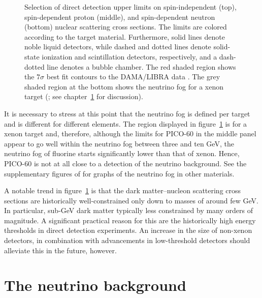 \begin{figure}
    \vspace*{-1.0pc}
    \caption{Selection of direct detection upper limits on spin-independent (top), spin-dependent proton (middle), and spin-dependent neutron (bottom) nuclear scattering cross sections. The limits are colored according to the target material. Furthermore, solid lines denote noble liquid detectors, while dashed and dotted lines denote solid-state ionization and scintillation detectors, respectively, and a dash-dotted line denotes a bubble chamber. The red shaded region shows the $7\sigma$ best fit contours to the DAMA/LIBRA data \parencite{SavageEtAl2009}. The grey shaded region at the bottom shows the neutrino fog for a xenon target (\textcite{OHare2021}; see chapter~\ref{chap:background} for discussion).}
    \label{fig:dd-reach}
\end{figure}

It is necessary to stress at this point that the neutrino fog is defined per target and is different for different elements. The region displayed in figure~\ref{fig:dd-reach} is for a xenon target and, therefore, although the limits for PICO-60 in the middle panel appear to go well within the neutrino fog between three and ten GeV, the neutrino fog of fluorine starts significantly lower than that of xenon. Hence, PICO-60 is not at all close to a detection of the neutrino background. See the supplementary figures of \textcite{OHare2021} for graphs of the neutrino fog in other materials.

A notable trend in figure~\ref{fig:dd-reach} is that the dark matter--nucleon scattering cross sections are historically well-constrained only down to masses of around few GeV. In particular, sub-GeV dark matter typically less constrained by many orders of magnitude. A significant practical reason for this are the historically high energy thresholds in direct detection experiments. An increase in the size of non-xenon detectors, in combination with advancements in low-threshold detectors should alleviate this in the future, however.

\chapter{The neutrino background}
\label{chap:background}

